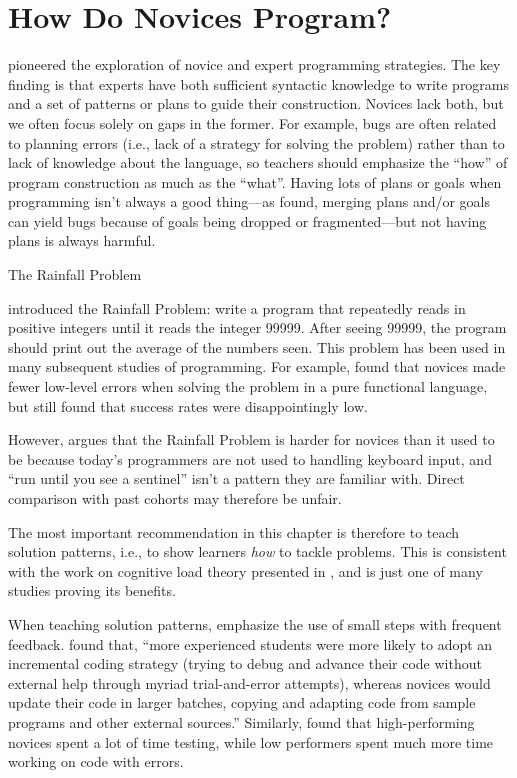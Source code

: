 \section{How Do Novices Program?}\label{s:pck-programming}

\cite{Solo1984,Solo1986} pioneered the exploration of novice and
expert programming strategies.  The key finding is that experts have
both sufficient syntactic knowledge to write programs and a set of
patterns or plans to guide their construction.  Novices lack both, but
we often focus solely on gaps in the former.  For example, bugs are
often related to planning errors (i.e., lack of a strategy for solving
the problem) rather than to lack of knowledge about the language, so
teachers should emphasize the ``how'' of program construction as much
as the ``what''.  Having lots of plans or goals when programming isn't
always a good thing---as \cite{Spoh1985} found, merging plans and/or
goals can yield bugs because of goals being dropped or
fragmented---but not having plans is always harmful.

\begin{callout}{The Rainfall Problem}

  \cite{Solo1986} introduced the Rainfall Problem: write a program
  that repeatedly reads in positive integers until it reads the
  integer 99999. After seeing 99999, the program should print out the
  average of the numbers seen.  This problem has been used in many
  subsequent studies of programming.  For example, \cite{Fisl2014}
  found that novices made fewer low-level errors when solving the
  problem in a pure functional language, but \cite{Sepp2015} still
  found that success rates were disappointingly low.

  However, \cite{Simo2013} argues that the Rainfall Problem is harder
  for novices than it used to be because today's programmers are not
  used to handling keyboard input, and ``run until you see a
  sentinel'' isn't a pattern they are familiar with.  Direct
  comparison with past cohorts may therefore be unfair.

\end{callout}

The most important recommendation in this chapter is therefore to
teach solution patterns, i.e., to show learners \emph{how} to tackle
problems. This is consistent with the work on cognitive load theory
presented in , and \cite{Mull2007b} is just one of
many studies proving its benefits.

When teaching solution patterns, emphasize the use of small steps with
frequent feedback. \cite{Blik2014} found that, ``more experienced
students were more likely to adopt an incremental coding strategy
(trying to debug and advance their code without external help through
myriad trial-and-error attempts), whereas novices would update their
code in larger batches, copying and adapting code from sample programs
and other external sources.''  Similarly, \cite{Cart2017} found that
high-performing novices spent a lot of time testing, while low
performers spent much more time working on code with errors.

